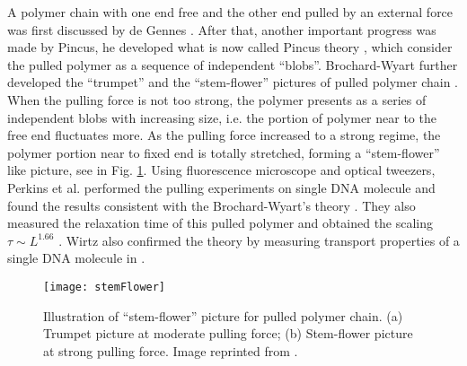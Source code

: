 A polymer chain with one end free and the other end pulled by an external force was first discussed by de Gennes \cite{DeGennes1974,DeGennes1979}. After that, another important progress was made by Pincus, he developed what is now called Pincus theory \cite{Pincus1976,Pincus1977}, which consider the pulled polymer as a sequence of independent ``blobs''.  Brochard-Wyart further developed the ``trumpet'' and the ``stem-flower'' pictures of pulled polymer chain \cite{Brochard-Wyart1993a,Brochard-Wyart1994a,Brochard-Wyart1995,Adjarei1995a}. When the pulling force is not too strong, the polymer presents as a series of independent blobs with increasing size, i.e. the portion of polymer near to the free end fluctuates more. As the pulling force increased to a strong regime, the polymer portion near to fixed end is totally stretched, forming a ``stem-flower'' like picture, see in Fig. \ref{fig:stemFlower}.  
Using fluorescence microscope and optical tweezers,  Perkins et al. performed the pulling experiments on single DNA molecule and found the results consistent with the Brochard-Wyart's theory \cite{Perkins1995a,Perkins1994}. They also measured the relaxation time of this pulled polymer and obtained the scaling $\tau \sim L^{1.66}$ \cite{Perkins1994a}. Wirtz also confirmed the theory by measuring transport properties of a single DNA molecule in \cite{Wirtz1995}.

\begin{figure}[htpb]
    \centering
    \texttt{[image: stemFlower]}
    \caption{Illustration of ``stem-flower'' picture for pulled polymer chain. (a) Trumpet picture at moderate pulling force; (b) Stem-flower picture at strong pulling force. Image reprinted from \cite{Brochard-Wyart1995}.}
    \label{fig:stemFlower}
\end{figure}


